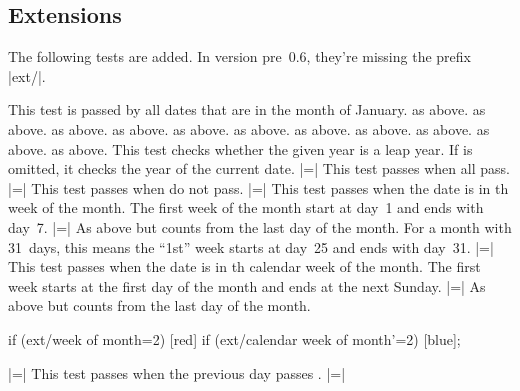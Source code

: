 \begin{multicols}{2}

\subsection{Extensions}

The following tests are added.
In version pre~0.6, they're missing the prefix |ext/|.
\begin{itemize}
 This test is passed by all dates that are in the month of January.
 as above.
 as above.
 as above.
 as above.
 as above.
 as above.
 as above.
 as above.
 as above.
 as above.
 as above.
    This test checks whether the given year is a leap year. If
     is omitted, it checks the year of the current date.
|=|
    This test passes when all  pass.
|=|
    This test passes when  do not pass.
|=|
    This test passes when the date is in th week of the month.
    The first week of the month start at day~1 and ends with day~7.
|=|
    As above but counts from the last day of the month.
    For a month with 31~days, this means the ``1st'' week starts at day~25 and ends with day~31.
|=|
    This test passes when the date is in th calendar week of the month.
    The first week starts at the first day of the month and ends at the next Sunday.
|=|
    As above but counts from the last day of the month.
\begin{codeexample}[width=5cm,preamble=\usetikzlibrary{ext.calendar-plus}]
\tikz
  \calendar[
    dates=2022-10-01 to 2022-10-31,
    week list]
    if (ext/week of month=2)           [red]
    if (ext/calendar week of month'=2) [blue];
\end{codeexample}
|=|
    This test passes when the previous day passes .
|=|

\end{itemize}
\end{multicols}
